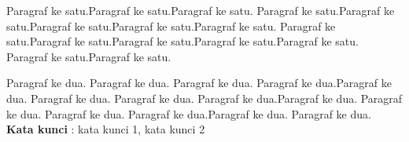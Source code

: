 \begin{spacing}{1}
	
Paragraf ke satu.Paragraf ke satu.Paragraf ke satu. Paragraf ke satu.Paragraf ke satu.Paragraf ke satu.Paragraf ke satu.Paragraf ke satu. Paragraf ke satu.Paragraf ke satu.Paragraf ke satu.Paragraf ke satu.Paragraf ke satu. Paragraf ke satu.Paragraf ke satu.

Paragraf ke dua. Paragraf ke dua. Paragraf ke dua. Paragraf ke dua.Paragraf ke dua. Paragraf ke dua. Paragraf ke dua. Paragraf ke dua.Paragraf ke dua. Paragraf ke dua. Paragraf ke dua. Paragraf ke dua.Paragraf ke dua. Paragraf ke dua. \\

\vspace{2ex}
\textbf{Kata kunci }: kata kunci 1, kata kunci 2
	
\end{spacing}
